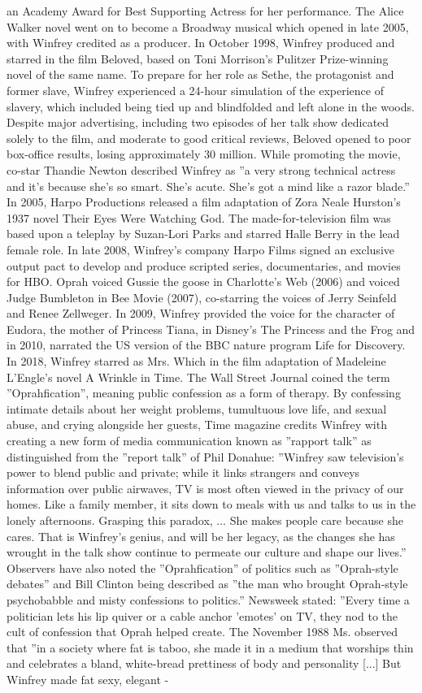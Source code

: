 \documentclass[11pt,a4paper, onecolumn]{article}
\begin{document}
an Academy Award for Best Supporting Actress for her performance. The Alice Walker novel went on to become a Broadway musical which opened in late 2005, with Winfrey credited as a producer. In October 1998, Winfrey produced and starred in the film Beloved, based on Toni Morrison's Pulitzer Prize-winning novel of the same name. To prepare for her role as Sethe, the protagonist and former slave, Winfrey experienced a 24-hour simulation of the experience of slavery, which included being tied up and blindfolded and left alone in the woods. Despite major advertising, including two episodes of her talk show dedicated solely to the film, and moderate to good critical reviews, Beloved opened to poor box-office results, losing approximately  30 million. While promoting the movie, co-star Thandie Newton described Winfrey as ''a very strong technical actress and it's because she's so smart. She's acute. She's got a mind like a razor blade.'' In 2005, Harpo Productions released a film adaptation of Zora Neale Hurston's 1937 novel Their Eyes Were Watching God. The made-for-television film was based upon a teleplay by Suzan-Lori Parks and starred Halle Berry in the lead female role. In late 2008, Winfrey's company Harpo Films signed an exclusive output pact to develop and produce scripted series, documentaries, and movies for HBO. Oprah voiced Gussie the goose in Charlotte's Web (2006) and voiced Judge Bumbleton in Bee Movie (2007), co-starring the voices of Jerry Seinfeld and Renee Zellweger. In 2009, Winfrey provided the voice for the character of Eudora, the mother of Princess Tiana, in Disney's The Princess and the Frog and in 2010, narrated the US version of the BBC nature program Life for Discovery. In 2018, Winfrey starred as Mrs. Which in the film adaptation of Madeleine L'Engle's novel A Wrinkle in Time. The Wall Street Journal coined the term ''Oprahfication'', meaning public confession as a form of therapy. By confessing intimate details about her weight problems, tumultuous love life, and sexual abuse, and crying alongside her guests, Time magazine credits Winfrey with creating a new form of media communication known as ''rapport talk'' as distinguished from the ''report talk'' of Phil Donahue: ''Winfrey saw television's power to blend public and private; while it links strangers and conveys information over public airwaves, TV is most often viewed in the privacy of our homes. Like a family member, it sits down to meals with us and talks to us in the lonely afternoons. Grasping this paradox, ... She makes people care because she cares. That is Winfrey's genius, and will be her legacy, as the changes she has wrought in the talk show continue to permeate our culture and shape our lives.'' Observers have also noted the ''Oprahfication'' of politics such as ''Oprah-style debates'' and Bill Clinton being described as ''the man who brought Oprah-style psychobabble and misty confessions to politics.'' Newsweek stated: ''Every time a politician lets his lip quiver or a cable anchor 'emotes' on TV, they nod to the cult of confession that Oprah helped create. The November 1988 Ms. observed that ''in a society where fat is taboo, she made it in a medium that worships thin and celebrates a bland, white-bread prettiness of body and personality [...] But Winfrey made fat sexy, elegant - 
\end{document}
